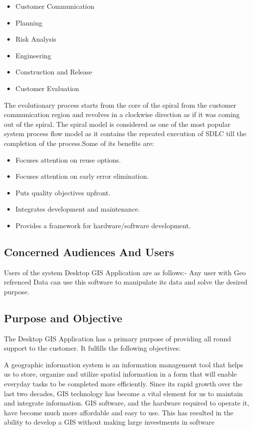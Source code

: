 \begin{itemize}
\item Customer Communication
\item Planning
\item Risk Analysis
\item Engineering
\item Construction and Release
\item Customer Evaluation
\end{itemize}
The evolutionary process starts from the core of the spiral from the customer communication region and revolves in a clockwise direction as if it was coming out of the spiral. The spiral model is considered as  one of the most popular system process flow model as it contains the repeated execution of SDLC till the completion of the process.Some of its benefits are:
\begin{itemize}
\item Focuses attention on reuse options.
\item Focuses attention on early error elimination.
\item Puts quality objectives upfront.
\item Integrates development and maintenance.
\item Provides a framework for hardware/software development.
\end{itemize}

\subsection{Concerned Audiences And Users }
Users of the system Desktop GIS Application are as follows:-
Any user with Geo refrenced Data can use this software to manipulate its data and solve the desired purpose.

\subsection{Purpose and Objective}
The Desktop GIS Application has a primary purpose of providing all round support to the customer. It fulfills the following objectives:

A geographic information system is an information management tool that helps us to store, organize and utilize spatial information in a form that will enable everyday tasks to be completed more efficiently. Since its rapid growth over the last two decades, GIS technology has become a vital element for us to maintain and integrate information. GIS software, and the hardware required to operate it, have become much more affordable and easy to use. This has resulted in the ability to develop a GIS without making large investments in software

